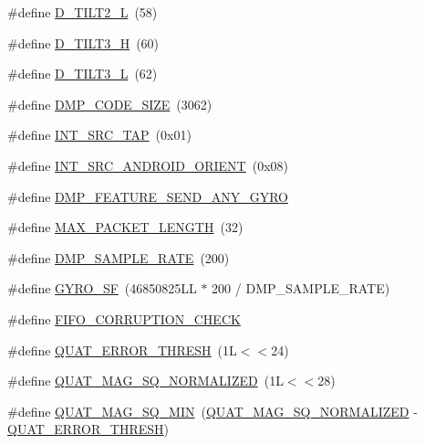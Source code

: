 \begin{DoxyCompactItemize}
\item 
\#define \hyperlink{group___d_r_i_v_e_r_s_ga1f94ccf82d2693832423d759dba5dbfa}{D\+\_\+\+T\+I\+L\+T2\+\_\+L}~(58)
\item 
\#define \hyperlink{group___d_r_i_v_e_r_s_ga296360133bdb8e75a844083e52ae6542}{D\+\_\+\+T\+I\+L\+T3\+\_\+H}~(60)
\item 
\#define \hyperlink{group___d_r_i_v_e_r_s_gab62313b938bb0a02efe7584203c0c950}{D\+\_\+\+T\+I\+L\+T3\+\_\+L}~(62)
\item 
\#define \hyperlink{group___d_r_i_v_e_r_s_ga304702b72a030fceea30b45d1ab53a5c}{D\+M\+P\+\_\+\+C\+O\+D\+E\+\_\+\+S\+I\+ZE}~(3062)
\item 
\#define \hyperlink{group___d_r_i_v_e_r_s_gac5690dcf21f75f38bc3ea13ad4799714}{I\+N\+T\+\_\+\+S\+R\+C\+\_\+\+T\+AP}~(0x01)
\item 
\#define \hyperlink{group___d_r_i_v_e_r_s_ga7c3f4a57d404a1321ce6dfc00e33ac4d}{I\+N\+T\+\_\+\+S\+R\+C\+\_\+\+A\+N\+D\+R\+O\+I\+D\+\_\+\+O\+R\+I\+E\+NT}~(0x08)
\item 
\#define \hyperlink{group___d_r_i_v_e_r_s_gadda8f4118bd084cfb4fcda3571585c56}{D\+M\+P\+\_\+\+F\+E\+A\+T\+U\+R\+E\+\_\+\+S\+E\+N\+D\+\_\+\+A\+N\+Y\+\_\+\+G\+Y\+RO}
\item 
\#define \hyperlink{group___d_r_i_v_e_r_s_ga973c680573b37fc359fc68d0707da355}{M\+A\+X\+\_\+\+P\+A\+C\+K\+E\+T\+\_\+\+L\+E\+N\+G\+TH}~(32)
\item 
\#define \hyperlink{group___d_r_i_v_e_r_s_ga9d0f0425cbcb58186500cb8686e41e67}{D\+M\+P\+\_\+\+S\+A\+M\+P\+L\+E\+\_\+\+R\+A\+TE}~(200)
\item 
\#define \hyperlink{group___d_r_i_v_e_r_s_gac0325c658f2911bdfc3b44fca31c684f}{G\+Y\+R\+O\+\_\+\+SF}~(46850825\+L\+L $\ast$ 200 / D\+M\+P\+\_\+\+S\+A\+M\+P\+L\+E\+\_\+\+R\+A\+T\+E)
\item 
\#define \hyperlink{group___d_r_i_v_e_r_s_gabb3bcb4d19c847aa89a356478b7da027}{F\+I\+F\+O\+\_\+\+C\+O\+R\+R\+U\+P\+T\+I\+O\+N\+\_\+\+C\+H\+E\+CK}
\item 
\#define \hyperlink{group___d_r_i_v_e_r_s_ga633dcbd524d41e6f76c0fda39828c8e1}{Q\+U\+A\+T\+\_\+\+E\+R\+R\+O\+R\+\_\+\+T\+H\+R\+E\+SH}~(1\+L$<$$<$24)
\item 
\#define \hyperlink{group___d_r_i_v_e_r_s_ga290880f86641e11d62db9792eab808bd}{Q\+U\+A\+T\+\_\+\+M\+A\+G\+\_\+\+S\+Q\+\_\+\+N\+O\+R\+M\+A\+L\+I\+Z\+ED}~(1\+L$<$$<$28)
\item 
\#define \hyperlink{group___d_r_i_v_e_r_s_gae76871da254b93d8b944ec65792db252}{Q\+U\+A\+T\+\_\+\+M\+A\+G\+\_\+\+S\+Q\+\_\+\+M\+IN}~(\hyperlink{group___d_r_i_v_e_r_s_ga290880f86641e11d62db9792eab808bd}{Q\+U\+A\+T\+\_\+\+M\+A\+G\+\_\+\+S\+Q\+\_\+\+N\+O\+R\+M\+A\+L\+I\+Z\+ED} -\/ \hyperlink{group___d_r_i_v_e_r_s_ga633dcbd524d41e6f76c0fda39828c8e1}{Q\+U\+A\+T\+\_\+\+E\+R\+R\+O\+R\+\_\+\+T\+H\+R\+E\+SH})

\end{DoxyCompactItemize}
